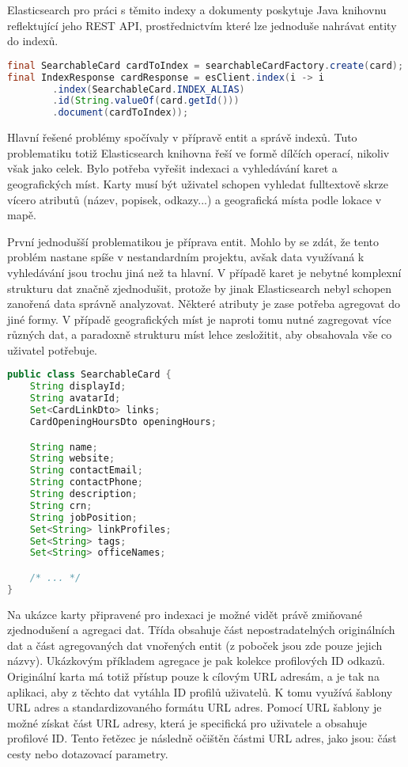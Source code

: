 		Elasticsearch pro práci s těmito indexy a dokumenty poskytuje Java knihovnu reflektující jeho \ac{REST} \ac{API},
		prostřednictvím které lze jednoduše nahrávat entity do indexů.

		\begin{lstlisting}[language=Java, caption={Ukázka indexace jedné karty do Elasticsearch databáze. Zdroj: [autor]}]
final SearchableCard cardToIndex = searchableCardFactory.create(card);
final IndexResponse cardResponse = esClient.index(i -> i
		.index(SearchableCard.INDEX_ALIAS)
		.id(String.valueOf(card.getId()))
		.document(cardToIndex));
		\end{lstlisting}

		Hlavní řešené problémy spočívaly v přípravě entit a správě indexů.
		Tuto problematiku totiž Elasticsearch knihovna řeší ve formě dílčích operací, nikoliv však jako celek.
		Bylo potřeba vyřešit indexaci a vyhledávání karet a geografických míst.
		Karty musí být uživatel schopen vyhledat fulltextově skrze vícero atributů (název, popisek, odkazy...) a geografická
		místa podle lokace v mapě.

		První jednodušší problematikou je příprava entit.
		Mohlo by se zdát, že tento problém nastane spíše v nestandardním projektu, avšak data využívaná k vyhledávání
		jsou trochu jiná než ta hlavní.
		V případě karet je nebytné komplexní strukturu dat značně zjednodušit, protože by jinak Elasticsearch
		nebyl schopen zanořená data správně analyzovat.
		Některé atributy je zase potřeba agregovat do jiné formy.
		V případě geografických míst je naproti tomu nutné zagregovat více různých dat, a paradoxně strukturu míst lehce
		zesložitit, aby obsahovala vše co uživatel potřebuje.

		\begin{lstlisting}[language=Java, caption={Ukázka indexovatelné karty. Obsahuje metadata a vyhledatelná data. Zdroj: [autor]}]
public class SearchableCard {
    String displayId;
    String avatarId;
    Set<CardLinkDto> links;
    CardOpeningHoursDto openingHours;

    String name;
    String website;
    String contactEmail;
    String contactPhone;
    String description;
    String crn;
    String jobPosition;
    Set<String> linkProfiles;
    Set<String> tags;
    Set<String> officeNames;

    /* ... */
}
		\end{lstlisting}

		Na ukázce karty připravené pro indexaci je možné vidět právě zmiňované zjednodušení a agregaci dat.
		Třída obsahuje část nepostradatelných originálních dat a část agregovaných dat vnořených entit (z poboček jsou
		zde pouze jejich názvy).
		Ukázkovým příkladem agregace je pak kolekce profilových ID odkazů.
		Originální karta má totiž přístup pouze k cílovým \ac{URL} adresám, a je tak na aplikaci, aby z těchto dat
		vytáhla ID profilů uživatelů.
		K tomu využívá šablony \ac{URL} adres a standardizovaného formátu \ac{URL} adres.
		Pomocí \ac{URL} šablony je možné získat část \ac{URL} adresy, která je specifická pro uživatele a obsahuje profilové ID.
		Tento řetězec je následně očištěn částmi \ac{URL} adres, jako jsou: část cesty nebo dotazovací parametry.


